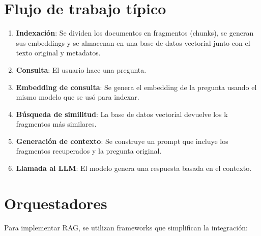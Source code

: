 \documentclass[12pt,a4paper,openany,oneside]{book}
\begin{document}
\section{Flujo de trabajo típico}
\begin{enumerate}
    \item \textbf{Indexación}: Se dividen los documentos en fragmentos (chunks), se generan sus embeddings y se almacenan en una base de datos vectorial junto con el texto original y metadatos.
    \item \textbf{Consulta}: El usuario hace una pregunta.
    \item \textbf{Embedding de consulta}: Se genera el embedding de la pregunta usando el mismo modelo que se usó para indexar.
    \item \textbf{Búsqueda de similitud}: La base de datos vectorial devuelve los k fragmentos más similares.
    \item \textbf{Generación de contexto}: Se construye un prompt que incluye los fragmentos recuperados y la pregunta original.
    \item \textbf{Llamada al LLM}: El modelo genera una respuesta basada en el contexto.
\end{enumerate}

\begin{center}
\shorthandoff{>}
\shorthandon{>}
\end{center}

\section{Orquestadores}
Para implementar RAG, se utilizan frameworks que simplifican la integración:
\end{document}
